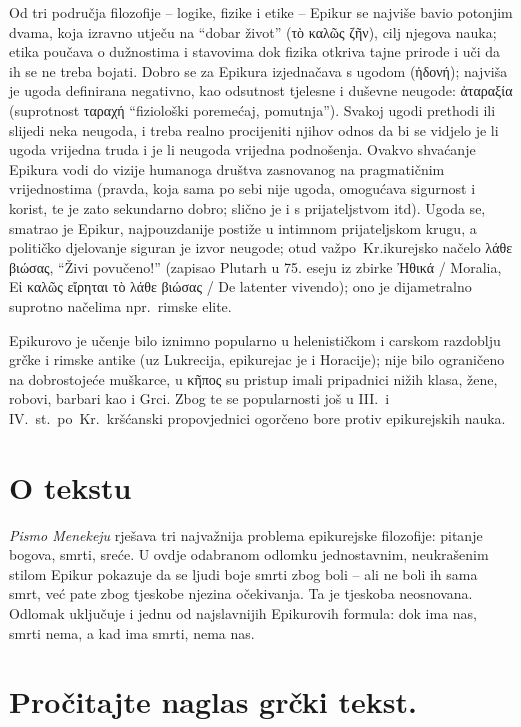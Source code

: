 Od tri područja filozofije – logike, fizike i etike – Epikur se najviše bavio potonjim dvama, koja izravno utječu na ``dobar život'' \textgreek{(τὸ καλῶς ζῆν),} cilj njegova nauka; etika poučava o dužnostima i stavovima dok fizika otkriva tajne prirode i uči da ih se ne treba bojati. Dobro se za Epikura izjednačava s ugodom \textgreek{(ἡδονή)}; najviša je ugoda definirana negativno, kao odsutnost tjelesne i duševne neugode: \textgreek{ἀταραξία} (suprotnost ταραχή ``fiziološki poremećaj, pomutnja''). Svakoj ugodi prethodi ili slijedi neka neugoda, i treba realno procijeniti njihov odnos da bi se vidjelo je li ugoda vrijedna truda i je li neugoda vrijedna podnošenja. Ovakvo shvaćanje Epikura vodi do vizije humanoga društva zasnovanog na pragmatičnim vrijednostima (pravda, koja sama po sebi nije ugoda, omogućava sigurnost i korist, te je zato sekundarno dobro; slično je i s prijateljstvom itd). Ugoda se, smatrao je Epikur, najpouzdanije postiže u intimnom prijateljskom krugu, a političko djelovanje siguran je izvor neugode; otud važpo~Kr.ikurejsko načelo \textgreek{λάθε βιώσας}, ``Živi povučeno!'' (zapisao Plutarh u 75. eseju iz zbirke Ἠθικά / Moralia, Εἰ καλῶς εἴρηται τὸ λάθε βιώσας / De latenter vivendo); ono je dijametralno suprotno načelima npr.\ rimske elite.

Epikurovo je učenje bilo iznimno popularno u helenističkom i carskom razdoblju grčke i rimske antike (uz Lukrecija, epikurejac je i Horacije); nije bilo ograničeno na dobrostojeće muškarce, u \textgreek{κῆπος} su pristup imali pripadnici nižih klasa, žene, robovi, barbari kao i Grci. Zbog te se popularnosti još u III.\ i IV.~st.\ po~Kr.\ kršćanski propovjednici ogorčeno bore protiv epikurejskih nauka.

\section*{O tekstu}

\textit{Pismo Menekeju} rješava tri najvažnija problema epikurejske filozofije: pitanje bogova, smrti, sreće. U ovdje odabranom odlomku jednostavnim, neukrašenim stilom Epikur pokazuje da se ljudi boje smrti zbog boli – ali ne boli ih sama smrt, već pate zbog tjeskobe njezina očekivanja. Ta je tjeskoba neosnovana. Odlomak uključuje i jednu od najslavnijih Epikurovih formula: dok ima nas, smrti nema, a kad ima smrti, nema nas.


\section*{Pročitajte naglas grčki tekst.}

